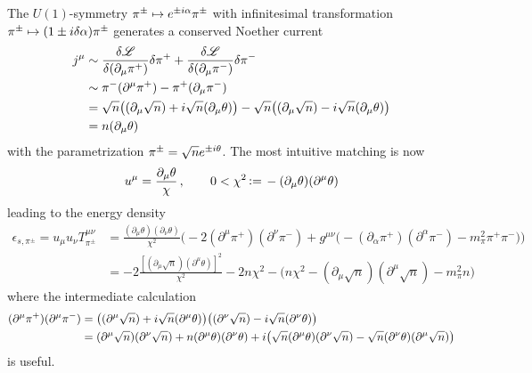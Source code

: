 The $U(1)$-symmetry $\pi^\pm\mapsto e^{\pm{i}\alpha}\pi^\pm$ with infinitesimal transformation $\pi^\pm\mapsto(1\pm{i}\delta\alpha)\pi^\pm$ generates a conserved Noether current
\begin{subequations}
    \begin{align}
        j^\mu&\sim\frac{\delta\mathscr{L}}{\delta(\partial_\mu\pi^+)}\delta\pi^++\frac{\delta\mathscr{L}}{\delta(\partial_\mu\pi^-)}\delta\pi^-\\
        &\sim\pi^-(\partial^\mu\pi^+)-\pi^+(\partial_\mu\pi^-)\\
        &=\sqrt{n}\big((\partial_\mu\sqrt{n})+{i}\sqrt{n}(\partial_\mu\theta)\big)-\sqrt{n}\big((\partial_\mu\sqrt{n})-{i}\sqrt{n}(\partial_\mu\theta)\big)\\
        &=n(\partial_\mu\theta)
    \end{align}
\end{subequations}
with the parametrization $\pi^\pm=\sqrt{n}e^{\pm{i}\theta}$. The most intuitive matching is now
\begin{equation}
    u^\mu=\frac{\partial_\mu\theta}{\chi}\,,\qquad 0<\chi^2{\,\vcentcolon=\,}-(\partial_\mu\theta)(\partial^\mu\theta)
\end{equation}
leading to the energy density
\begin{subequations}
    \begin{align}
        \epsilon_{s,\pi^\pm}=u_\mu u_\nu T^{\mu\nu}_{\pi^\pm}&=\frac{(\partial_\mu\theta)(\partial_\nu\theta)}{\chi^2}\Big(-2(\partial^\mu\pi^+)(\partial^\nu\pi^-)+g^{\mu\nu}\big(-(\partial_\alpha\pi^+)(\partial^\alpha\pi^-)-m_\pi^2\pi^+\pi^-\big)\Big)\\
        &=-2\frac{[(\partial_\mu\sqrt{n})(\partial^\mu\theta)]^2}{\chi^2}-2n\chi^2-\big(n\chi^2-(\partial_\mu\sqrt{n})(\partial^\mu\sqrt{n})-m_\pi^2n\big)
    \end{align}
\end{subequations}
where the intermediate calculation
\begin{subequations}
    \begin{align}
        (\partial^\mu\pi^+)(\partial^\mu\pi^-)&=\big((\partial^\mu\sqrt{n})+{i}\sqrt{n}(\partial^\mu\theta)\big)\big((\partial^\nu\sqrt{n})-{i}\sqrt{n}(\partial^\nu\theta)\big)\\
        &=(\partial^\mu\sqrt{n})(\partial^\nu\sqrt{n})+n(\partial^\mu\theta)(\partial^\nu\theta)+{i}\big(\sqrt{n}(\partial^\mu\theta)(\partial^\nu\sqrt{n})-\sqrt{n}(\partial^\nu\theta)(\partial^\mu\sqrt{n})\big)
    \end{align}
\end{subequations}
is useful.

